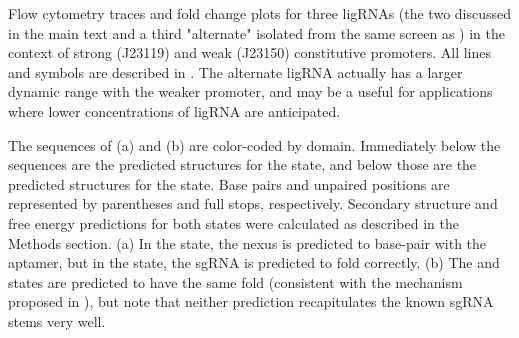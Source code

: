 \documentclass[10pt,oneside]{article}
\begin{document}

      Flow cytometry traces and fold change plots for three ligRNAs (the two discussed in the main text and a third "alternate" isolated from the same screen as \ligrnaF{}) in the context of strong (J23119) and weak (J23150) constitutive promoters.  All lines and symbols are described in .  The alternate ligRNA actually has a larger dynamic range with the weaker promoter, and may be a useful for applications where lower concentrations of ligRNA are anticipated.



     The sequences of \ligrnaF{} (a) and \ligrnaB{} (b) are color-coded by domain.  Immediately below the sequences are the predicted structures for the \apo{} state, and below those are the predicted structures for the \holo{} state.  Base pairs and unpaired positions are represented by parentheses and full stops, respectively.  Secondary structure and free energy predictions for both states were calculated as described in the Methods section.  (a) In the \apo{} state, the nexus is predicted to base-pair with the aptamer, but in the \holo{} state, the sgRNA is predicted to fold correctly.  (b) The \apo{} and \holo{} states are predicted to have the same fold (consistent with the mechanism proposed in ), but note that neither prediction recapitulates the known sgRNA stems very well.


\end{document}
